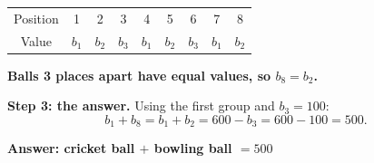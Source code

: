 \documentclass[11pt,a4paper]{article}
\begin{document}
\begin{center}\small\renewcommand{\arraystretch}{1.6}\begin{tabular}{c|cccccccc}
\toprule
Position & 1 & 2 & 3 & 4 & 5 & 6 & 7 & 8\\
Value & $b_1$ & $b_2$ & $b_3$ & $b_1$ & $b_2$ & $b_3$ & $b_1$ & $b_2$\\
\bottomrule\end{tabular}\end{center}

\textbf{\boldmath Balls 3 places apart have equal values, so $b_8 = b_2$.}

\textbf{\boldmath Step 3: the answer.} Using the first group and $b_3 = 100$:
\[ b_1 + b_8 = b_1 + b_2 = 600 - b_3 = 600 - 100 = 500. \]

\begin{center}\textbf{\boldmath Answer: cricket ball $+$ bowling ball $= 500$}\end{center}
\end{document}
